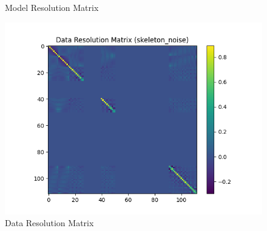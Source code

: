 \documentclass{article}
\begin{document}
\begin{itemize}
\begin{figure}[h]
        \caption{Model Resolution Matrix}
    \end{figure}
    \begin{figure}[h]
        \centering
        \includegraphics[width=1\textwidth]{images/outputs/datares/skeleton_noise.png}
        \caption{Data Resolution Matrix}
    \end{figure}
    \clearpage



\end{itemize}
\end{document}
